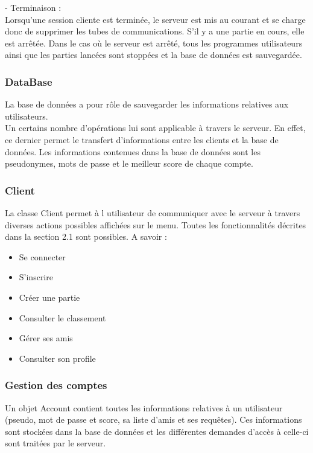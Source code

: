 \documentclass[a4paper,12pt]{article}
\begin{document}
- Terminaison : \\
Lorsqu'une session cliente est terminée, le serveur est mis au courant et se charge donc de supprimer les tubes de communications. S'il y a une partie en cours, elle est arrêtée. 
Dans le cas où le serveur est arrêté, tous les programmes utilisateurs ainsi que les parties lancées sont stoppées et la base de données est sauvegardée. \\

\subsubsection{DataBase}

La base de données a pour rôle de sauvegarder les informations relatives aux utilisateurs. \\
Un certains nombre d'opérations lui sont applicable à travers le serveur. En effet, ce dernier permet le transfert d'informations
entre les clients et la base de données. 
Les informations contenues dans la base de données sont les pseudonymes, mots de passe et le meilleur score de chaque compte. 

\subsubsection{Client}
La classe Client permet à l utilisateur de communiquer avec le serveur à travers diverses actions possibles affichées sur le menu.
Toutes les fonctionnalités décrites dans la section 2.1 sont possibles. A savoir : 
\begin{itemize}
    \item Se connecter
    \item S'inscrire
    \item Créer une partie
    \item Consulter le classement
    \item Gérer ses amis
    \item Consulter son profile
\end{itemize}


\subsubsection{Gestion des comptes}
Un objet Account contient toutes les informations relatives à un utilisateur (pseudo, mot de passe et score, sa liste d'amis et ses requêtes). 
Ces informations sont stockées dans la base de données et les différentes demandes d'accès à celle-ci sont traitées par le serveur.
\end{document}
